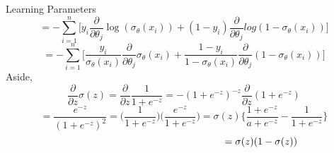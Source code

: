 \documentclass{beamer}
\begin{document}
	\begin{frame}{Learning Parameters}
	    \begin{equation*}
	        = -\sum_{i=1}^{n}\bigg[y_{i}\frac{\partial}{\partial \theta_{j}} \log(\sigma_{\theta}(x_{i})) + (1-y_{i})\frac{\partial}{\partial \theta_{j}} log(1 - \sigma_{\theta}(x_{i}))\bigg]
	    \end{equation*}
	    \begin{equation}
	        = -\sum_{i=1}^{n}\bigg[\frac{y_{i}}{\sigma_{\theta}(x_{i})} \frac{\partial}{\partial \theta_{j}} \sigma_{\theta}(x_{i}) + \frac{1 - y_{i}}{1 - \sigma_{\theta}(x_{i})} \frac{\partial}{\partial \theta_{j}}(1 - \sigma_{\theta}(x_{i}))\bigg]
	    \end{equation}
	    Aside,
	    \begin{equation*}
	        \frac{\partial}{\partial z}\sigma(z) = \frac{\partial}{\partial z}\frac{1}{1 + e^{-z}} = -(1 + e^{-z})^{-z}\frac{\partial}{\partial z}(1 + e^{-z})
	    \end{equation*}
	    \begin{equation*}
	        = \frac{e^{-z}}{(1 + e^{-z})^{2}} = \bigg(\frac{1}{1 + e^{-z}}\bigg)\bigg(\frac{e^{-z}}{1 + e^{-z}}\bigg) = \sigma(z)\bigg\{\frac{1 + e^{-z}}{a + e^{-z}} - \frac{1}{1 + e^{-z}}\bigg\}
	    \end{equation*}
	    \begin{equation*}
	        \hspace{5.5cm}= \sigma(z)(1 - \sigma(z))
	    \end{equation*}
	\end{frame}
\end{document}
